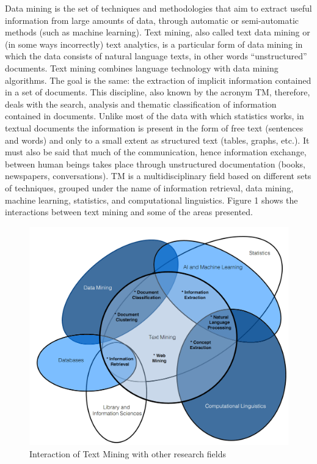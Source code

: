\documentclass[
]{book}
\begin{document}
Data mining is the set of techniques and methodologies that aim to extract useful information from large amounts of data, through automatic or semi-automatic methods (such as machine learning).
Text mining, also called text data mining or (in some ways incorrectly) text analytics, is a particular form of data mining in which the data consists of natural language texts, in other words ``unstructured'' documents. Text mining combines language technology with data mining algorithms. The goal is the same: the extraction of implicit information contained in a set of documents.
This discipline, also known by the acronym TM, therefore, deals with the search, analysis and thematic classification of information contained in documents. Unlike most of the data with which statistics works, in textual documents the information is present in the form of free text (sentences and words) and only to a small extent as structured text (tables, graphs, etc.). It must also be said that much of the communication, hence information exchange, between human beings takes place through unstructured documentation (books, newspapers, conversations).
TM is a multidisciplinary field based on different sets of techniques, grouped under the name of information retrieval, data mining, machine learning, statistics, and computational linguistics. Figure 1 shows the interactions between text mining and some of the areas presented.

\begin{figure}
\includegraphics[width=20.83in]{tmimg} \caption{Interaction of Text Mining with other research fields}\label{fig:unnamed-chunk-1}
\end{figure}
\end{document}
